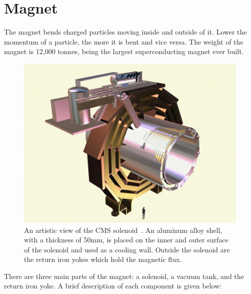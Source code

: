 \section{Magnet}
The magnet bends charged particles moving inside and
outside of it. Lower the momentum of a particle, the more it is bent and vice
versa. The weight of the magnet is 12,000 tonnes, being the largest superconducting
magnet ever built.
\begin{figure}
  \begin{center}
  \includegraphics[width=0.50\linewidth]{Experiment/CMS/Image/cmssol.jpg}
	  \caption{An artistic view of the CMS solenoid~\cite{cmsSol}. 
	  An aluminum alloy shell, with a thickness of 50\unit{mm}, is placed on the 
	  inner and outer surface of the solenoid and used as a cooling wall.
	  Outside the solenoid are the return iron yokes which hold the 
	  magnetic flux.}
  \label{fig:cms_sol}
  \end{center}
\end{figure}
There are three main parts of the magnet: a solenoid, a vacuum 
tank, and the return iron yoke. A brief description of each component is given below:
